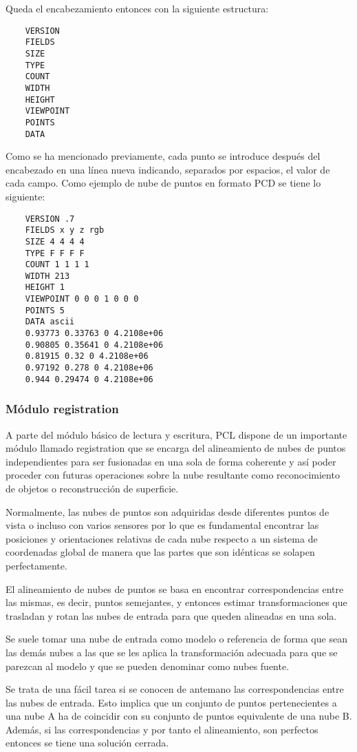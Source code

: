 
Queda el encabezamiento entonces con la siguiente estructura:
\begin{lstlisting}
	VERSION
	FIELDS
	SIZE
	TYPE
	COUNT
	WIDTH
	HEIGHT
	VIEWPOINT
	POINTS
	DATA
\end{lstlisting}

Como se ha mencionado previamente, cada punto se introduce después del encabezado en una línea nueva indicando, separados por espacios, el valor de cada campo. Como ejemplo de nube de puntos en formato PCD se tiene lo siguiente:

\begin{lstlisting}
	VERSION .7
	FIELDS x y z rgb
	SIZE 4 4 4 4
	TYPE F F F F
	COUNT 1 1 1 1
	WIDTH 213
	HEIGHT 1
	VIEWPOINT 0 0 0 1 0 0 0
	POINTS 5
	DATA ascii
	0.93773 0.33763 0 4.2108e+06
	0.90805 0.35641 0 4.2108e+06
	0.81915 0.32 0 4.2108e+06
	0.97192 0.278 0 4.2108e+06
	0.944 0.29474 0 4.2108e+06
\end{lstlisting}


\subsubsection{Módulo registration}
A parte del módulo básico de lectura y escritura, PCL dispone de un importante módulo llamado registration que se encarga del alineamiento de nubes de puntos independientes para ser fusionadas en una sola de forma coherente y así poder proceder con futuras operaciones sobre la nube resultante como reconocimiento de objetos o reconstrucción de superficie.

Normalmente, las nubes de puntos son adquiridas desde diferentes puntos de vista o incluso con varios sensores por lo que es fundamental encontrar las posiciones y orientaciones relativas de cada nube respecto a un sistema de coordenadas global de manera que las partes que son idénticas se solapen perfectamente.

El alineamiento de nubes de puntos se basa en encontrar correspondencias entre las mismas, es decir, puntos semejantes, y entonces estimar transformaciones que trasladan y rotan las nubes de entrada para que queden alineadas en una sola.

Se suele tomar una nube de entrada como modelo o referencia de forma que sean las demás nubes a las que se les aplica la transformación adecuada para que se parezcan al modelo y que se pueden denominar como nubes fuente. 

Se trata de una fácil tarea si se conocen de antemano las correspondencias entre las nubes de entrada. Esto implica que un conjunto de puntos pertenecientes a una nube A ha de coincidir con su conjunto de puntos equivalente de una nube B. Además, si las correspondencias y por tanto el alineamiento, son perfectos entonces se tiene una solución cerrada.

